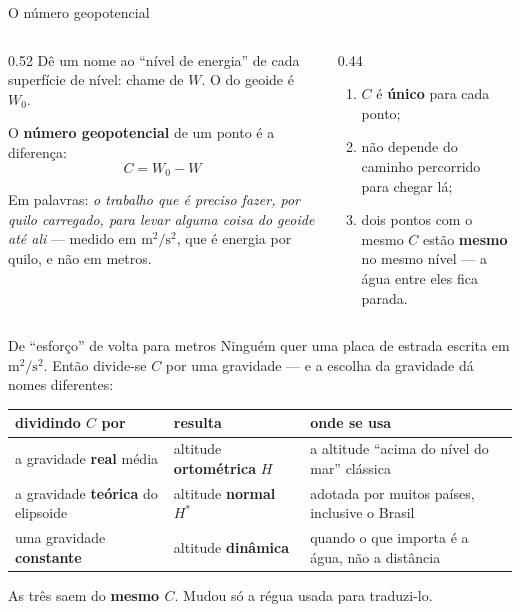 \documentclass[aspectratio=169,11pt]{beamer}
\newcommand{\bnum}[1]{\textbf{\textcolor{mTeal}{#1}}}
\begin{document}
\begin{frame}{O número geopotencial}
  \begin{columns}[T]
    \begin{column}{0.52\textwidth}
      Dê um nome ao ``nível de energia'' de cada superfície de nível: chame de $W$.
      O do geoide é $W_0$.
      \medskip

      O \bnum{número geopotencial} de um ponto é a diferença:
      \[ \boxed{\; C = W_0 - W \;} \]
      \medskip

      Em palavras: \emph{o trabalho que é preciso fazer, por quilo carregado, para levar
      alguma coisa do geoide até ali} --- medido em $\text{m}^2/\text{s}^2$, que é
      energia por quilo, \alert{e não em metros}.
    \end{column}
    \begin{column}{0.44\textwidth}
      \begin{ideia}[title={As três propriedades que salvam tudo}]
        \begin{enumerate}
          \item $C$ é \bnum{único} para cada ponto;
          \item \alert{não depende do caminho} percorrido para chegar lá;
          \item dois pontos com o mesmo $C$ estão \bnum{mesmo} no mesmo nível ---
                a água entre eles fica parada.
        \end{enumerate}
      \end{ideia}
    \end{column}
  \end{columns}
\end{frame}

\begin{frame}{De ``esforço'' de volta para metros}
  Ninguém quer uma placa de estrada escrita em $\text{m}^2/\text{s}^2$. Então divide-se
  $C$ por uma gravidade --- e a escolha da gravidade \alert{dá nomes diferentes}:
  \medskip
  \centering
  \small
  \renewcommand{\arraystretch}{1.5}
  \begin{tabular}{p{3.6cm}lp{4.6cm}}
    \toprule
    dividindo $C$ por & resulta & onde se usa \\
    \midrule
    a gravidade \textbf{real} média & altitude
      \textcolor{corGeoide}{\textbf{ortométrica}} $H$ &
      a altitude ``acima do nível do mar'' clássica \\
    a gravidade \textbf{teórica} do elipsoide & altitude \textbf{normal} $H^{*}$ &
      adotada por muitos países, inclusive o Brasil \\
    uma gravidade \textbf{constante} & altitude \textbf{dinâmica} &
      quando o que importa é a água, não a distância \\
    \bottomrule
  \end{tabular}
  \medskip

  As três saem do \bnum{mesmo $C$}. Mudou só a régua usada para traduzi-lo.
\end{frame}
\end{document}
